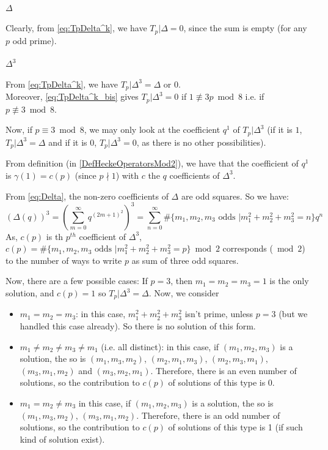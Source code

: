 \paragraph{$\Delta$}
Clearly, from \eqref{eq:TpDelta^k}, we have $T_p|\Delta = 0$, since the sum is empty (for any $p$ odd prime).

\paragraph{$\Delta^3$}
From \eqref{eq:TpDelta^k}, we have $T_p|\Delta^3 = \Delta \text{ or } 0$.\\
Moreover, \eqref{eq:TpDelta^k_bis} gives $T_p|\Delta^3 = 0$ if $1 \not\equiv 3p \bmod 8$ i.e. if $p \not\equiv 3 \bmod 8$.

Now, if $p \equiv 3 \bmod 8$, we may only look at the coefficient $q^1$ of $T_p|\Delta^3$ (if it is $1$, $T_p|\Delta^3 = \Delta$ and if it is $0$, $T_p|\Delta^3 = 0$, as there is no other possibilities).

From definition (in \ref{DefHeckeOperatorsMod2}), we have that the coefficient of $q^1$ is $\gamma(1) = c(p)$ (since $p \nmid 1$) with $c$ the $q$ coefficients of $\Delta^3$.

From \eqref{eq:Delta}, the non-zero coefficients of $\Delta$ are odd squares.
So we have:
$$
\left( \Delta(q) \right)^3
= \left( \sum_{m=0}^{\infty} q^{(2m+1)^2} \right)^3
= \sum_{n=0}^{\infty} \#\{m_1, m_2, m_3 \text{ odds } | m_1^2 + m_2^2 + m_3^2 = n\} q^n
$$
As, $c(p)$ is th $p^{th}$ coefficient of $\Delta^3$, $c(p) = \#\{m_1, m_2, m_3 \text{ odds } | m_1^2 + m_2^2 + m_3^2 = p\} \bmod 2$ corresponds ($\bmod 2$) to the number of ways to write $p$ as sum of three odd squares.

Now, there are a few possible cases:
If $p=3$, then $m_1=m_2=m_3=1$ is the only solution, and $c(p)=1$ so $T_p|\Delta^3=\Delta$.
Now, we consider 
\begin{itemize}
	\item $m_1=m_2=m_3$: in this case, $m_1^2 + m_2^2 + m_3^2$ isn't prime, unless $p=3$ (but we handled this case already). So there is no solution of this form.
	\item $m_1 \neq m_2 \neq m_3 \neq m_1$ (i.e. all distinct): in this case, if $(m_1, m_2, m_3)$ is a solution, the so is $(m_1, m_3, m_2)$, $(m_2, m_1, m_3)$, $(m_2, m_3, m_1)$, $(m_3, m_1, m_2)$ and $(m_3, m_2, m_1)$. Therefore, there is an even number of solutions, so the contribution to $c(p)$ of solutions of this type is 0.
	\item $m_1 = m_2\neq m_3$ in this case, if $(m_1, m_2, m_3)$ is a solution, the so is $(m_1, m_3, m_2)$, $(m_3, m_1, m_2)$. Therefore, there is an odd number of solutions, so the contribution to $c(p)$ of solutions of this type is 1 (if such kind of solution exist).
\end{itemize}

